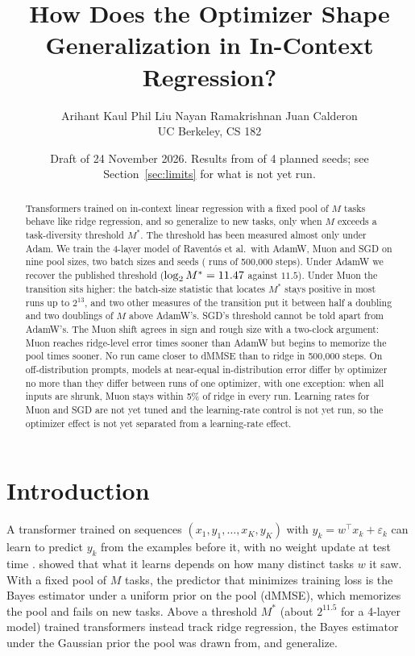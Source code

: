 \documentclass[11pt]{article}
\title{\vspace{-1.5em}How Does the Optimizer Shape Generalization in In-Context Regression?}
\author{Arihant Kaul \qquad Phil Liu \qquad Nayan Ramakrishnan \qquad Juan Calderon\\[0.3em]
\normalsize UC Berkeley, CS 182}
\date{\small Draft of 24 November 2026. Results from \NSeeds{} of 4 planned seeds; see Section~\ref{sec:limits} for what is not yet run.}
\newcommand{\Mstar}{M^{*}}
\begin{document}
\maketitle

\begin{abstract}
\noindent Transformers trained on in-context linear regression with a fixed pool of $M$ tasks behave like ridge regression, and so generalize to new tasks, only when $M$ exceeds a task-diversity threshold $\Mstar$. The threshold has been measured almost only under Adam. We train the 4-layer model of Ravent\'os et al.\ with AdamW, Muon and SGD on nine pool sizes, two batch sizes and \NSeeds{} seeds (\NRuns{} runs of 500{,}000 steps). Under AdamW we recover the published threshold ($\log_2 \Mstar = \MstarAdamw$ against $11.5$). Under Muon the transition sits higher: the batch-size statistic that locates $\Mstar$ stays positive in most runs up to $2^{13}$, and two other measures of the transition put it between half a doubling and two doublings of $M$ above AdamW's. SGD's threshold cannot be told apart from AdamW's. The Muon shift agrees in sign and rough size with a two-clock argument: Muon reaches ridge-level error \RegSpeedMuon{} times sooner than AdamW but begins to memorize the pool \MemSpeedMuon{} times sooner. No run came closer to dMMSE than to ridge in 500{,}000 steps. On off-distribution prompts, models at near-equal in-distribution error differ by optimizer no more than they differ between runs of one optimizer, with one exception: when all inputs are shrunk, Muon stays within 5\% of ridge in every run. Learning rates for Muon and SGD are not yet tuned and the learning-rate control is not yet run, so the optimizer effect is not yet separated from a learning-rate effect.
\end{abstract}

\section{Introduction}

A transformer trained on sequences $(x_1, y_1, \dots, x_K, y_K)$ with $y_k = w^\top x_k + \varepsilon_k$ can learn to predict $y_k$ from the examples before it, with no weight update at test time \citep{garg2022}. \citet{raventos2023} showed that what it learns depends on how many distinct tasks $w$ it saw. With a fixed pool of $M$ tasks, the predictor that minimizes training loss is the Bayes estimator under a uniform prior on the pool (dMMSE), which memorizes the pool and fails on new tasks. Above a threshold $\Mstar$ (about $2^{11.5}$ for a 4-layer model) trained transformers instead track ridge regression, the Bayes estimator under the Gaussian prior the pool was drawn from, and generalize.
\end{document}
